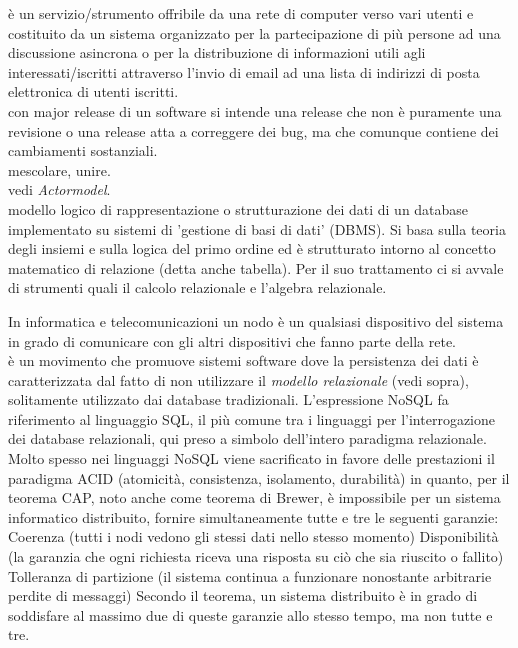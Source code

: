 \documentclass{scalatekids-article}
\begin{document}
   è un servizio/strumento offribile da una rete di computer verso vari utenti e costituito da un sistema organizzato per la partecipazione di più persone ad una discussione asincrona o per la distribuzione di informazioni utili agli interessati/iscritti attraverso l'invio di email ad una lista di indirizzi di posta elettronica di utenti iscritti.
  \\

   con major release di un software si intende una release che non è puramente una revisione o una release atta a correggere dei bug, ma che comunque contiene dei cambiamenti sostanziali.
  \\
  
   mescolare, unire.
  \\

   vedi \textit{Actormodel}.
  \\

   modello logico di rappresentazione o strutturazione dei dati di un database implementato su sistemi di 'gestione di basi di dati' (DBMS).
  Si basa sulla teoria degli insiemi e sulla logica del primo ordine ed è strutturato intorno al concetto matematico di relazione (detta anche tabella). Per il suo trattamento ci si avvale di strumenti quali il calcolo relazionale e l'algebra relazionale.
  \\

  
   In informatica e telecomunicazioni un nodo è un qualsiasi dispositivo del sistema in grado di comunicare con gli altri dispositivi che fanno parte della rete.
  \\

   è un movimento che promuove sistemi software dove la persistenza dei dati è caratterizzata dal fatto di non utilizzare il \textit{modello relazionale} (vedi sopra), solitamente utilizzato dai database tradizionali.
  L'espressione NoSQL fa riferimento al linguaggio SQL, il più comune tra i linguaggi per l'interrogazione dei database relazionali, qui preso a simbolo dell'intero paradigma relazionale. Molto spesso nei linguaggi NoSQL viene sacrificato in favore delle prestazioni il paradigma ACID (atomicità, consistenza, isolamento, durabilità) in quanto, per il teorema CAP, noto anche come teorema di Brewer, è impossibile per un sistema informatico distribuito, fornire simultaneamente tutte e tre le seguenti garanzie:
  Coerenza (tutti i nodi vedono gli stessi dati nello stesso momento)
  Disponibilità (la garanzia che ogni richiesta riceva una risposta su ciò che sia riuscito o fallito)
  Tolleranza di partizione (il sistema continua a funzionare nonostante arbitrarie perdite di messaggi)
  Secondo il teorema, un sistema distribuito è in grado di soddisfare al massimo due di queste garanzie allo stesso tempo, ma non tutte e tre.
  \\
\end{document}
